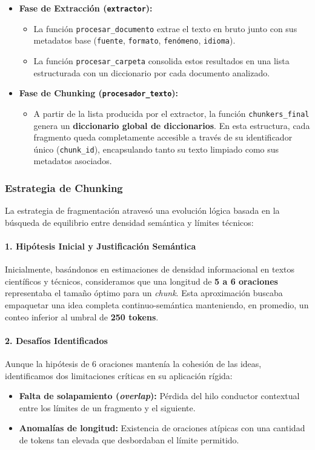 \documentclass[12pt,a4paper]{article}
\begin{document}
\begin{itemize}
    \item \textbf{Fase de Extracción (\texttt{extractor}):} 
    \begin{itemize}
        \item La función \texttt{procesar\_documento} extrae el texto en bruto junto con sus metadatos base (\texttt{fuente}, \texttt{formato}, \texttt{fenómeno}, \texttt{idioma}).
        \item La función \texttt{procesar\_carpeta} consolida estos resultados en una lista estructurada con un diccionario por cada documento analizado.
    \end{itemize}

    \item \textbf{Fase de Chunking (\texttt{procesador\_texto}):} 
    \begin{itemize}
        \item A partir de la lista producida por el extractor, la función \texttt{chunkers\_final} genera un \textbf{diccionario global de diccionarios}. En esta estructura, cada fragmento queda completamente accesible a través de su identificador único (\texttt{chunk\_id}), encapsulando tanto su texto limpiado como sus metadatos asociados.
    \end{itemize}
\end{itemize}

\subsubsection{Estrategia de Chunking}

La estrategia de fragmentación atravesó una evolución lógica basada en la búsqueda de equilibrio entre densidad semántica y límites técnicos:

\paragraph{1. Hipótesis Inicial y Justificación Semántica}
Inicialmente, basándonos en estimaciones de densidad informacional en textos científicos y técnicos, consideramos que una longitud de \textbf{5 a 6 oraciones} representaba el tamaño óptimo para un \textit{chunk}. Esta aproximación buscaba empaquetar una idea completa continuo-semántica manteniendo, en promedio, un conteo inferior al umbral de \textbf{250 tokens}.

\paragraph{2. Desafíos Identificados}
Aunque la hipótesis de 6 oraciones mantenía la cohesión de las ideas, identificamos dos limitaciones críticas en su aplicación rígida:
\begin{itemize}
    \item \textbf{Falta de solapamiento (\textit{overlap}):} Pérdida del hilo conductor contextual entre los límites de un fragmento y el siguiente.
    \item \textbf{Anomalías de longitud:} Existencia de oraciones atípicas con una cantidad de tokens tan elevada que desbordaban el límite permitido.
\end{itemize}
\end{document}

